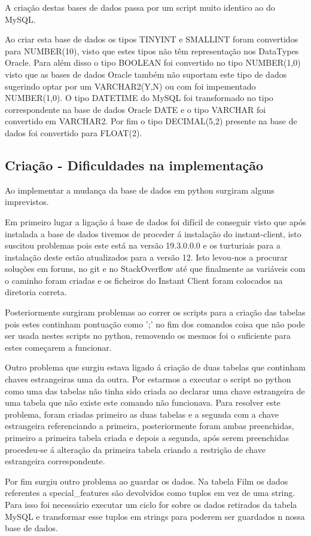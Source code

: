 \par A criação destas bases de dados passa por um script muito identico ao do MySQL.\newline
\par Ao criar esta base de dados os tipos TINYINT e SMALLINT foram convertidos para NUMBER(10), visto que estes tipos não têm representação nos DataTypes Oracle. Para além disso o tipo BOOLEAN foi convertido no tipo NUMBER(1,0) visto que as bases de dados Oracle também não suportam este tipo de dados sugerindo optar por um VARCHAR2(Y,N) ou com foi impementado NUMBER(1,0). O tipo DATETIME do MySQL foi transformado no tipo correspondente na base de dados Oracle DATE e o tipo VARCHAR foi convertido em VARCHAR2. Por fim o tipo DECIMAL(5,2) presente na base de dados foi convertido para FLOAT(2).

\subsection{Criação - Dificuldades na implementação}

\par Ao implementar a mudança da base de dados em python surgiram alguns imprevistos.
\par Em primeiro lugar a ligação á base de dados foi difícil de conseguir visto que após instalada a base de dados tivemos de proceder á instalação do instant-client, isto suscitou problemas pois este está na versão 19.3.0.0.0 e os turturiais para a instalação deste estão atualizados para a versão 12. Isto levou-nos a procurar soluções em foruns, no git e no StackOverflow até que finalmente as variáveis com o caminho foram criadas e os ficheiros do Instant Client foram colocados na diretoria correta.\newline
\par Posteriormente surgiram problemas ao correr os scripts para a criação das tabelas pois estes continham pontuação como ';' no fim dos comandos coisa que não pode ser usada nestes scripts no python, removendo os mesmos foi o suficiente para estes começarem a funcionar.\newline
\par Outro problema que surgiu estava ligado á criação de duas tabelas que continham chaves estrangeiras uma da outra. Por estarmos a executar o script no python como uma das tabelas não tinha sido criada ao declarar uma chave estrangeira de uma tabela que não existe este comando não funcionava. Para resolver este problema, foram criadas primeiro as duas tabelas e a segunda com a chave estrangeira referenciando a primeira, posteriormente foram ambas preenchidas, primeiro a primeira tabela criada e depois a segunda, após serem preenchidas procedeu-se á alteração da primeira tabela criando a restrição de chave estrangeira correspondente.\newline
\par Por fim surgiu outro problema ao guardar os dados. Na tabela Film os dados referentes a special\_features são devolvidos como tuplos em vez de uma string. Para isso foi necessário executar um ciclo for sobre os dados retirados da tabela MySQL e transformar esse tuplos em strings para poderem ser guardados n nossa base de dados.\newline  


